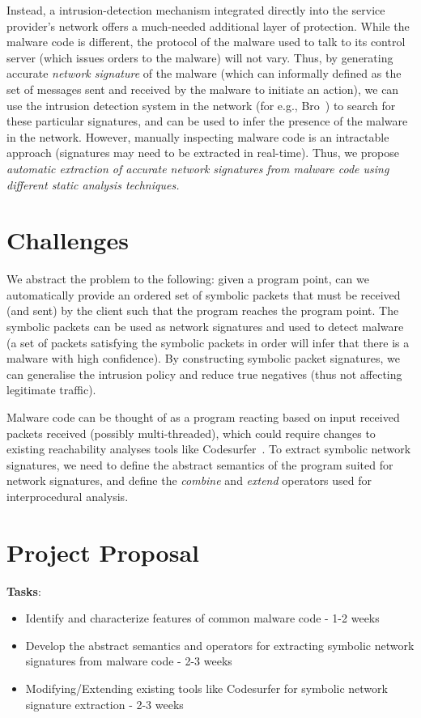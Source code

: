 \documentclass[]{article}
\begin{document}
Instead, a intrusion-detection mechanism integrated 
directly into the service provider’s network offers a
much-needed additional layer of protection. While the malware
code is different, the protocol of the malware used to talk to its
control server (which issues orders to the malware) will not vary. 
Thus, by generating accurate \emph{network signature} of the malware (which
can informally defined as the set of messages sent and received by the malware to
initiate an action), we can use the intrusion detection system in the
network (for e.g., Bro~\cite{bro}) to search for these particular signatures,
and can be used to infer the presence of the malware in the network. However,
manually inspecting malware code is an intractable approach (signatures may 
need to be extracted in real-time). Thus, we propose \emph{automatic extraction 
of accurate network signatures from malware code using different static
analysis techniques.} 

\section{Challenges}
We abstract the problem to the following: given a program point,
can we automatically provide an ordered set of symbolic packets 
that must be received (and sent) by the client such that the program 
reaches the program point. The symbolic packets can be used as
network signatures and used to detect malware (a set of packets
satisfying the symbolic packets in order will infer that there 
is a malware with high confidence). By constructing symbolic packet
signatures, we can generalise the intrusion policy and reduce 
true negatives (thus not affecting legitimate traffic).

Malware code can be thought of as a program reacting based on input received
packets received (possibly multi-threaded), which
could require changes to existing reachability analyses tools 
like Codesurfer~\cite{codesurfer}. To extract symbolic network
signatures, we need to define the abstract semantics of the program
suited for network signatures, and define the \emph{combine} and 
\emph{extend} operators used for interprocedural analysis.

\section{Project Proposal}
\textbf{Tasks}:
\begin{itemize}
	\item Identify and characterize features of common malware code - 1-2 weeks
	\item Develop the abstract semantics and operators for extracting  
	symbolic network signatures from malware code - 2-3 weeks
	\item Modifying/Extending existing tools like Codesurfer for symbolic 
	network signature extraction - 2-3 weeks
\end{itemize}
\end{document}

